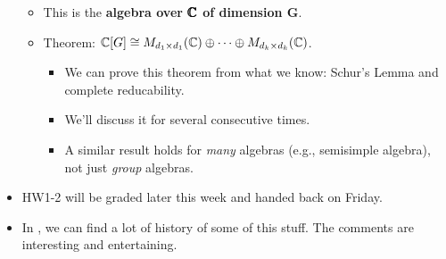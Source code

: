\documentclass[../notes.tex]{subfiles}
\begin{document}
\begin{itemize}
\begin{itemize}
        \item This is the \textbf{algebra over $\pmb{\mathbb{C}}$ of dimension $\bm{G}$}.
        \item Theorem: $\mathbb{C}[G]\cong M_{d_1\times d_1}(\mathbb{C})\oplus\cdots\oplus M_{d_k\times d_k}(\mathbb{C})$.
        \begin{itemize}
            \item We can prove this theorem from what we know: Schur's Lemma and complete reducability.
            \item We'll discuss it for several consecutive times.
            \item A similar result holds for \emph{many} algebras (e.g., semisimple algebra), not just \emph{group} algebras.
        \end{itemize}
    \end{itemize}
    \item HW1-2 will be graded later this week and handed back on Friday.
    \item In \textcite{bib:Etingof}, we can find a lot of history of some of this stuff. The comments are interesting and entertaining.
\end{itemize}
\end{document}
